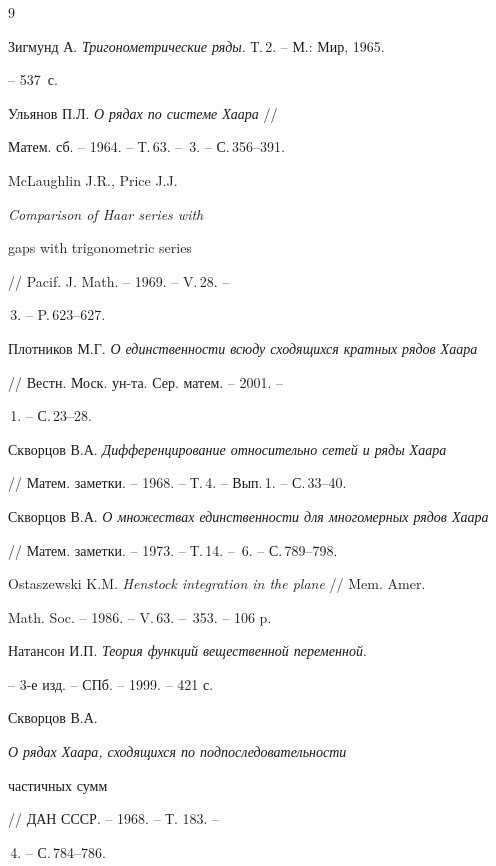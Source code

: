 \begin{thebibliography}{9}







Зигмунд А. {\em Тригонометрические ряды}. Т.\,2. -- М.: Мир, 1965.


-- 537~с.




Ульянов П.Л. {\em О рядах по системе Хаара} //


Матем. сб. -- 1964. -- Т.\,63. -- \No\,3. -- С.\,356--391.




McLaughlin J.R., Price J.J. {\em Comparison of Haar series with 


gaps with trigonometric series} // Pacif. J. Math. -- 1969. -- V.\,28. -- 


\No\,3. -- P.\,623--627.




Плотников М.Г. {\em О единственности всюду сходящихся кратных рядов Хаара} 


// Вестн. Моск. ун-та. Сер. матем. -- 2001. -- 


\No\,1. -- С.\,23--28.




Скворцов В.А. {\em Дифференцирование относительно сетей и ряды Хаара} 


// Матем. заметки. -- 1968. -- Т.\,4. -- Вып.\,1. -- С.\,33--40.




Скворцов В.А. {\em О множествах единственности для многомерных рядов Хаара}


// Матем. заметки. -- 1973. -- Т.\,14. -- \No\,6. -- С.\,789--798.




Ostaszewski K.M. {\em Henstock integration in the plane} // Mem. Amer. 


Math. Soc. -- 1986. -- V.\,63. -- \No\,353. -- 106 p.




Натансон И.П. {\em Теория функций вещественной переменной}.


-- 3-е изд. -- СПб. -- 1999. -- 421 с.




Скворцов В.А. {\em О рядах Хаара, сходящихся по подпоследовательности 


частичных сумм} // ДАН СССР. -- 1968. -- Т. 183. -- 


\No\,4. -- С.\,784--786.





\end{thebibliography}





\vskip 2cm












\label{end}





